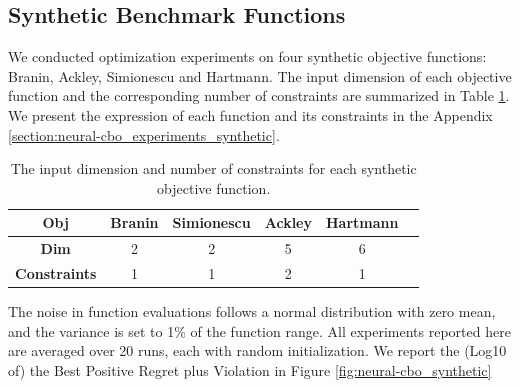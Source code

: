 \subsection{Synthetic Benchmark Functions}
\label{section:neural-cbo_synthetic}
We conducted optimization experiments on four synthetic objective functions: Branin, Ackley, Simionescu and Hartmann. The input dimension of each objective function and the corresponding number of constraints are summarized in Table \ref{tab:neural-cbo_synthetic_info}. We present the expression of each function and its constraints in the Appendix \ref{section:neural-cbo_experiments_synthetic}. 
  \begin{table}[h]
  \centering
 \caption{The input dimension and number of constraints for each synthetic objective function.}
 \vspace{0.15in}
\begin{tabular}{|c|c|c|c|c|c|}
\hline
\textbf{Obj}              & Branin & Simionescu & Ackley & Hartmann  \\ \hline
\textbf{Dim}                   & 2   & 2               & 5 & 6                  \\ \hline
\textbf{Constraints}       & 1      & 1              & 2       & 1          \\ \hline
\end{tabular}
\label{tab:neural-cbo_synthetic_info}
\end{table}
The noise in function evaluations follows a normal distribution with zero mean, and the variance is set to 1\% of the function range. All experiments reported here are averaged over 20 runs, each with random initialization. We report the (Log10 of) the Best Positive Regret plus Violation in Figure \ref{fig:neural-cbo_synthetic}

